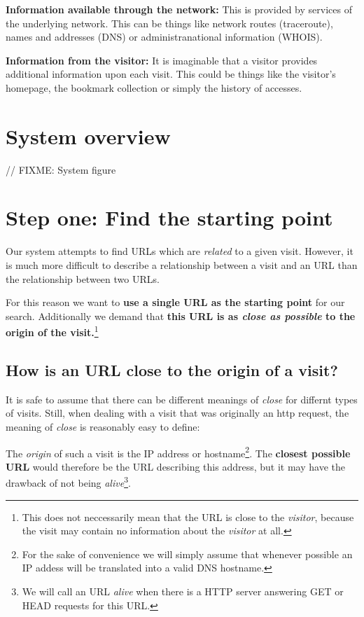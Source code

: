 \documentclass[a4paper]{danarticle}
\begin{document}
    \textbf{Information available through the network:} This is
    provided by services of the underlying network. This can
    be things like network routes (traceroute), names and addresses
    (DNS) or administranational information (WHOIS).
    
    \textbf{Information from the visitor:} It is imaginable that
    a visitor provides additional information upon each visit. 
    This could be things like the visitor's homepage, the 
    bookmark collection or simply the history of accesses.
  \section*{System overview}
    // FIXME: System figure
  \section*{Step one: Find the starting point}
    Our system attempts to find URLs which are \textit{related} to
    a given visit. However, it is much more difficult to describe
    a relationship between a visit and an URL than the relationship
    between two URLs.
    
    For this reason we want to \textbf{use a single URL as the
    starting point} for our search. Additionally we demand that
    \textbf{this URL is as \textit{close as possible} to the
    origin of the visit.}\footnote{This does not neccessarily
    mean that the URL is close to the \textit{visitor}, because
    the visit may contain no information about the \textit{visitor}
    at all.}
    
    \subsection*{How is an URL close to the origin of a visit?}
      It is safe to assume that there can be different meanings
      of \textit{close} for differnt types of visits. Still, when
      dealing with a visit that was originally an http request,
      the meaning of \textit{close} is reasonably easy to define:
      
      The \textit{origin} of such a visit is the IP address or
      hostname\footnote{For the sake of convenience we will simply
      assume that whenever possible an IP addess will be translated
      into a valid DNS hostname.}. The \textbf{closest possible URL}
      would therefore be the URL describing this address, but it
      may have the drawback of not being \textit{alive}\footnote{We
      will call an URL \textit{alive} when there is a HTTP server
      answering GET or HEAD requests for this URL.}.
      
\end{document}
